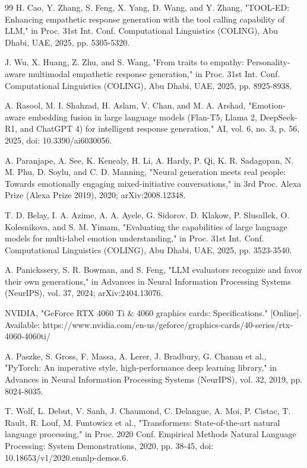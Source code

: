 \begin{thebibliography}{99}
H. Cao, Y. Zhang, S. Feng, X. Yang, D. Wang, and Y. Zhang, "TOOL-ED: Enhancing empathetic response generation with the tool calling capability of LLM," in Proc. 31st Int. Conf. Computational Linguistics (COLING), Abu Dhabi, UAE, 2025, pp. 5305-5320.

J. Wu, X. Huang, Z. Zhu, and S. Wang, "From traits to empathy: Personality-aware multimodal empathetic response generation," in Proc. 31st Int. Conf. Computational Linguistics (COLING), Abu Dhabi, UAE, 2025, pp. 8925-8938.

A. Rasool, M. I. Shahzad, H. Aslam, V. Chan, and M. A. Arshad, "Emotion-aware embedding fusion in large language models (Flan-T5, Llama 2, DeepSeek-R1, and ChatGPT 4) for intelligent response generation," AI, vol. 6, no. 3, p. 56, 2025, doi: 10.3390/ai6030056.

A. Paranjape, A. See, K. Kenealy, H. Li, A. Hardy, P. Qi, K. R. Sadagopan, N. M. Phu, D. Soylu, and C. D. Manning, "Neural generation meets real people: Towards emotionally engaging mixed-initiative conversations," in 3rd Proc. Alexa Prize (Alexa Prize 2019), 2020; arXiv:2008.12348.

T. D. Belay, I. A. Azime, A. A. Ayele, G. Sidorov, D. Klakow, P. Slusallek, O. Kolesnikova, and S. M. Yimam, "Evaluating the capabilities of large language models for multi-label emotion understanding," in Proc. 31st Int. Conf. Computational Linguistics (COLING), Abu Dhabi, UAE, 2025, pp. 3523-3540.

A. Panickssery, S. R. Bowman, and S. Feng, "LLM evaluators recognize and favor their own generations," in Advances in Neural Information Processing Systems (NeurIPS), vol. 37, 2024; arXiv:2404.13076.

NVIDIA, "GeForce RTX 4060 Ti \& 4060 graphics cards: Specifications." [Online]. Available: https://www.nvidia.com/en-us/geforce/graphics-cards/40-series/rtx-4060-4060ti/

A. Paszke, S. Gross, F. Massa, A. Lerer, J. Bradbury, G. Chanan et al., "PyTorch: An imperative style, high-performance deep learning library," in Advances in Neural Information Processing Systems (NeurIPS), vol. 32, 2019, pp. 8024-8035.

T. Wolf, L. Debut, V. Sanh, J. Chaumond, C. Delangue, A. Moi, P. Cistac, T. Rault, R. Louf, M. Funtowicz et al., "Transformers: State-of-the-art natural language processing," in Proc. 2020 Conf. Empirical Methods Natural Language Processing: System Demonstrations, 2020, pp. 38-45, doi: 10.18653/v1/2020.emnlp-demos.6.


\end{thebibliography}
